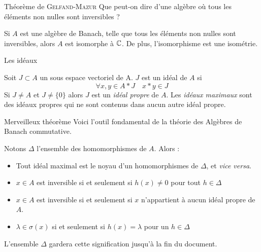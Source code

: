 \documentclass[11pt, xcolor=table]{beamer}
\begin{document}
\begin{frame}{Théorème de \textsc{Gelfand}-\textsc{Mazur}}
    Que peut-on dire d'une algèbre où tous les éléments non nulles sont inversibles ?

    \begin{myth}
        Si $A$ est une algèbre de Banach, telle que tous les éléments non nulles sont inversibles, alors $A$ est isomorphe à
        $\mathbb{C}$. De plus, l'isomorphisme est une isométrie.  
    \end{myth}
\end{frame}

\begin{frame}{Les idéaux}
    \begin{mydef}[Idéal]
        Soit $J \subset A$ un sous espace vectoriel de A. $J$ est un idéal de $A$ si 
        \[
            \forall x, y \in A*J \quad x*y \in J
        \] 
        Si $J \not = A$ et $J \not = \{0\}$ alors $J$ est un \emph{idéal propre} de $A$. Les \emph{idéaux maximaux} sont des idéaux propres qui ne sont
        contenus dans aucun autre idéal propre.
    \end{mydef}
\end{frame}

\begin{frame}{Merveilleux théorème}
    Voici l'outil fondamental de la théorie des Algèbres de Banach commutative.

       \begin{myth}
           Notons $\Delta$ l'ensemble des homomorphismes de $A$. Alors :
           \begin{itemize}[<+->]
               \item Tout idéal maximal est le noyau d'un homomorphismes de $\Delta$, et \emph{vice versa}.
               \item $x \in A$ est inversible si et seulement si $h(x) \not = 0$ pour tout $h \in \Delta$
               \item $x \in A$ est inversible si et seulement si $x$ n'appartient à aucun idéal propre de $A$.
               \item $\lambda \in \sigma(x) $  si et seulement si $h(x) = \lambda $ pour un $h \in \Delta$
           \end{itemize}

           L'ensemble $\Delta$ gardera cette signification jusqu'à la fin du document.
       \end{myth} 
\end{frame}
\end{document}
